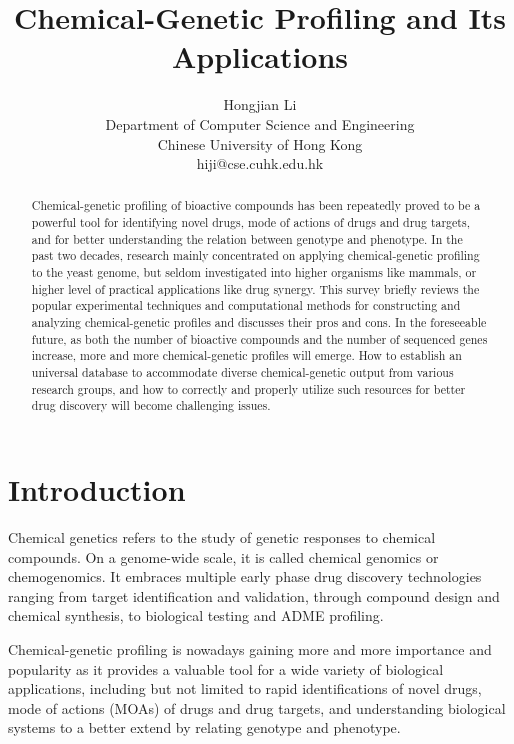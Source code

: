 \documentclass[12pt,fullpage,singlespace]{article}
\begin{document}
\title{Chemical-Genetic Profiling and Its Applications}
\author
{
Hongjian Li\\
Department of Computer Science and Engineering\\
Chinese University of Hong Kong\\
hiji@cse.cuhk.edu.hk
}
\maketitle


\begin{abstract}

Chemical-genetic profiling of bioactive compounds has been repeatedly proved to be a powerful tool for identifying novel drugs, mode of actions of drugs and drug targets, and for better understanding the relation between genotype and phenotype. In the past two decades, research mainly concentrated on applying chemical-genetic profiling to the yeast genome, but seldom investigated into higher organisms like mammals, or higher level of practical applications like drug synergy. This survey briefly reviews the popular experimental techniques and computational methods for constructing and analyzing chemical-genetic profiles and discusses their pros and cons. In the foreseeable future, as both the number of bioactive compounds and the number of sequenced genes increase, more and more chemical-genetic profiles will emerge. How to establish an universal database to accommodate diverse chemical-genetic output from various research groups, and how to correctly and properly utilize such resources for better drug discovery will become challenging issues.

\end{abstract}

\section{Introduction}

Chemical genetics refers to the study of genetic responses to chemical compounds. On a genome-wide scale, it is called chemical genomics or chemogenomics. It embraces multiple early phase drug discovery technologies ranging from target identification and validation, through compound design and chemical synthesis, to biological testing and ADME profiling.

Chemical-genetic profiling is nowadays gaining more and more importance and popularity as it provides a valuable tool for a wide variety of biological applications, including but not limited to rapid identifications of novel drugs, mode of actions (MOAs) of drugs and drug targets, and understanding biological systems to a better extend by relating genotype and phenotype.
\end{document}
